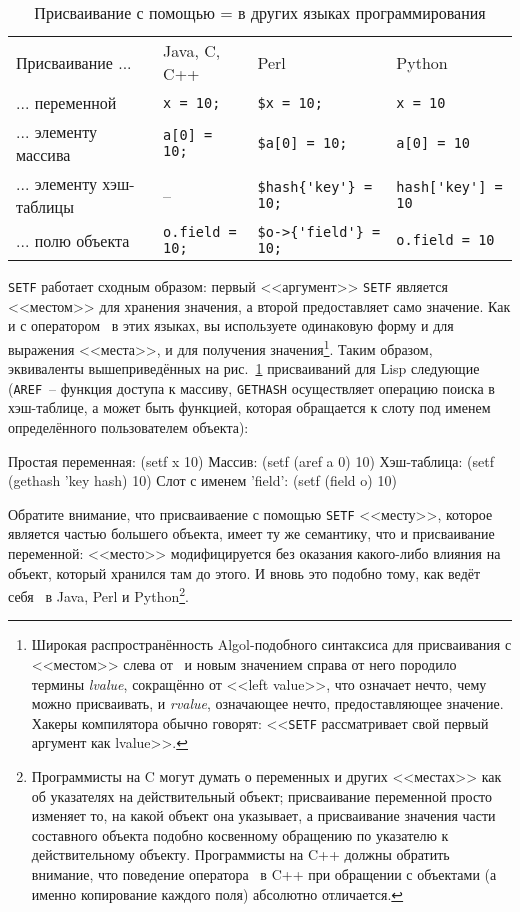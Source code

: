 \begin{table}[h]
\begin{tabular}{|m{42mm}|>{\centering}m{23mm}|>{\centering}m{30mm}|>{\centering}m{25mm}|}
Присваивание ...         & Java, C, C++        & Perl                & Python \\
... переменной           & \lstinline!x = 10;! & \lstinline!$x = 10;! & \lstinline!x = 10! \\
... элементу массива     & \lstinline!a[0] = 10;! & \lstinline!$a[0] = 10;! & \lstinline!a[0] = 10! \\
... элементу хэш-таблицы & --                  & \lstinline!$hash{'key'} = 10;!  & \lstinline!hash['key'] = 10! \\
... полю объекта         & \lstinline!o.field = 10;! & \lstinline!$o->{'field'} = 10;! & \lstinline!o.field = 10! 
\end{tabular}
  \caption{Присваивание с помощью = в других языках программирования} 
  \label{table:06-1}
\end{table}


\lstinline{SETF} работает сходным образом: первый <<аргумент>> \lstinline{SETF} является
<<местом>> для хранения значения, а второй предоставляет само значение. Как и с оператором~\code{=}
в этих языках, вы используете одинаковую форму и для выражения <<места>>, и для
получения значения\footnote{Широкая распространённость Algol-подобного синтаксиса для
  присваивания с <<местом>> слева от~\code{=} и новым значением справа от него породило термины
  \textit{lvalue}, сокращённо от <<left value>>, что означает нечто, чему можно
  присваивать, и \textit{rvalue}, означающее нечто, предоставляющее значение. Хакеры
  компилятора обычно говорят: <<\lstinline{SETF} рассматривает свой первый аргумент как
  lvalue>>.}. Таким образом, эквиваленты вышеприведённых на рис.~\ref{table:06-1} присваиваний для
Lisp следующие (\lstinline{AREF}~-- функция доступа к массиву, \lstinline{GETHASH} осуществляет
операцию поиска в хэш-таблице, а  может быть функцией, которая обращается к слоту под
именем  определённого пользователем объекта):

\begin{myverb}
  Простая переменная:    (setf x 10) 
  Массив:                (setf (aref a 0) 10)
  Хэш-таблица:           (setf (gethash 'key hash) 10)
  Слот с именем 'field': (setf (field o) 10)
\end{myverb}

Обратите внимание, что присваиваение с помощью \lstinline{SETF} <<месту>>, которое является
частью большего объекта, имеет ту же семантику, что и присваивание переменной: <<место>>
модифицируется без оказания какого-либо влияния на объект, который хранился там до
этого. И вновь это подобно тому, как ведёт себя~\code{=} в Java, Perl и
Python\footnote{Программисты на C могут думать о переменных и других <<местах>> как об
  указателях на действительный объект; присваивание переменной просто изменяет
  то, на какой объект она указывает, а присваивание значения части составного объекта
  подобно косвенному обращению по указателю к действительному объекту. Программисты на C++
  должны обратить внимание, что поведение оператора~\code{=} в C++ при обращении с объектами (а
  именно копирование каждого поля) абсолютно отличается.}.


